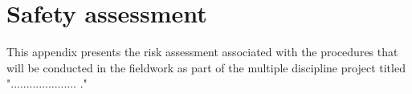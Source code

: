 
\chapter{Safety assessment}

This appendix presents the risk assessment associated with the procedures that will be conducted in the fieldwork as part of the multiple discipline project titled "..................... ."

